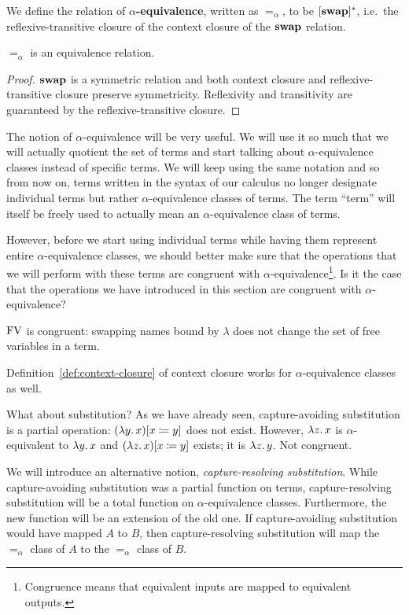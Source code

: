 \begin{definition}
  We define the relation of \textbf{$\alpha$-equivalence}, written as
  $=_\alpha$, to be $[\mathbin{\textbf{swap}}]^*$, i.e.\ the reflexive-transitive closure of
  the context closure of the $\mathbin{\textbf{swap}}$ relation.
\end{definition}

\begin{observation}
  $=_\alpha$ is an equivalence relation.
\end{observation}
\begin{proof}
  $\mathbin{\textbf{swap}}$ is a symmetric relation and both context closure and
  reflexive-transitive closure preserve symmetricity. Reflexivity and
  transitivity are guaranteed by the reflexive-transitive closure.
\end{proof}

The notion of $\alpha$-equivalence will be very useful. We will use it so
much that we will actually quotient the set of terms and start talking
about $\alpha$-equivalence classes instead of specific terms. We will keep
using the same notation and so from now on, terms written in the syntax of
our calculus no longer designate individual terms but rather
$\alpha$-equivalence classes of terms. The term ``term'' will itself be
freely used to actually mean an $\alpha$-equivalence class of terms.

However, before we start using individual terms while having them represent
entire $\alpha$-equivalence classes, we should better make sure that the
operations that we will perform with these terms are congruent with
$\alpha$-equivalence\footnote{Congruence means that equivalent inputs are
  mapped to equivalent outputs.}. Is it the case that the operations we
have introduced in this section are congruent with $\alpha$-equivalence?

$\operatorname{FV}$ is congruent: swapping names bound by $\lambda$ does not change the
set of free variables in a term.

Definition~\ref{def:context-closure} of context closure works for
$\alpha$-equivalence classes as well.

What about substitution? As we have already seen, capture-avoiding
substitution is a partial operation: $(\lambda y.\, x)[x \coloneqq y]$ does not
exist. However, $\lambda z.\, x$ is $\alpha$-equivalent to $\lambda y.\, x$ and
$(\lambda z.\, x)[x \coloneqq y]$ exists; it is $\lambda z.\, y$. Not congruent.

We will introduce an alternative notion, \emph{capture-resolving
  substitution}. While capture-avoiding substitution was a partial function
on terms, capture-resolving substitution will be a total function on
$\alpha$-equivalence classes. Furthermore, the new function will be an
extension of the old one. If capture-avoiding substitution would have
mapped $A$ to $B$, then capture-resolving substitution will map the
$=_\alpha$ class of $A$ to the $=_\alpha$ class of $B$.

